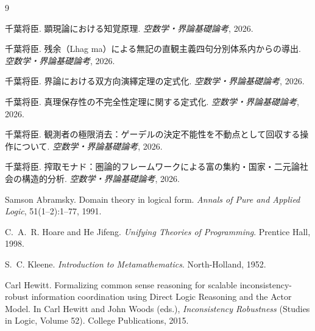 \documentclass[11pt,a4paper]{article}
\theoremstyle{definition}
\begin{document}
\begin{thebibliography}{9}

千葉将臣.
\newblock 顕現論における知覚原理.
\newblock \emph{空数学・界論基礎論考}, 2026.

千葉将臣.
\newblock 残余（Lhag ma）による無記の直観主義四句分別体系内からの導出.
\newblock \emph{空数学・界論基礎論考}, 2026.

千葉将臣.
\newblock 界論における双方向演繹定理の定式化.
\newblock \emph{空数学・界論基礎論考}, 2026.

千葉将臣.
\newblock 真理保存性の不完全性定理に関する定式化.
\newblock \emph{空数学・界論基礎論考}, 2026.

千葉将臣.
\newblock 観測者の極限消去：ゲーデルの決定不能性を不動点として回収する操作について.
\newblock \emph{空数学・界論基礎論考}, 2026.

千葉将臣.
\newblock 搾取モナド：圏論的フレームワークによる富の集約・国家・二元論社会の構造的分析.
\newblock \emph{空数学・界論基礎論考}, 2026.

Samson Abramsky.
\newblock Domain theory in logical form.
\newblock \emph{Annals of Pure and Applied Logic}, 51(1--2):1--77, 1991.

C.~A.~R. Hoare and He Jifeng.
\newblock \emph{Unifying Theories of Programming}.
\newblock Prentice Hall, 1998.

S.~C. Kleene.
\newblock \emph{Introduction to Metamathematics}.
\newblock North-Holland, 1952.

Carl Hewitt.
\newblock Formalizing common sense reasoning for scalable inconsistency-robust
information coordination using Direct Logic Reasoning and the Actor Model.
\newblock In Carl Hewitt and John Woods (eds.),
\emph{Inconsistency Robustness} (Studies in Logic, Volume 52).
College Publications, 2015.

\end{thebibliography}
\end{document}
